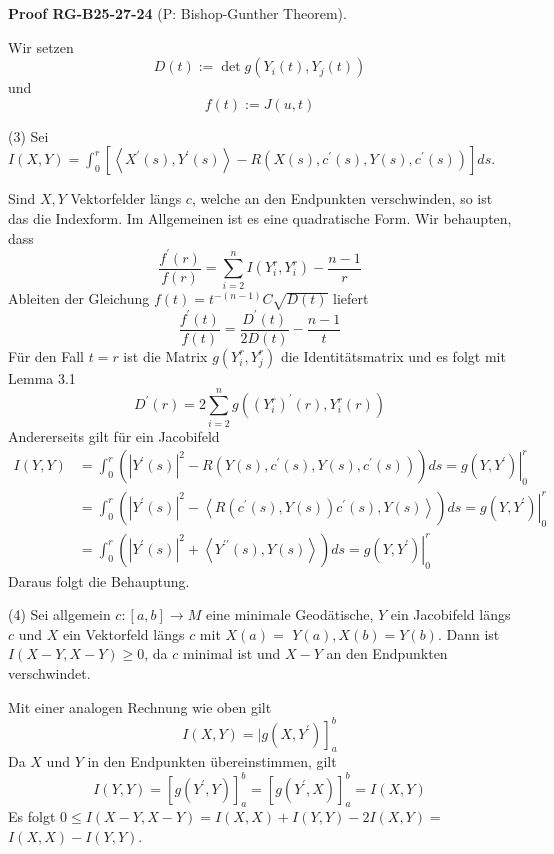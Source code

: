 \documentclass[10pt, letterpaper]{article}
\newcommand{\CustomHeading}[3]{%
  \par\medskip\noindent%
  \textbf{#1 #2} \textnormal{(#3)}.\enskip%
}
\newenvironment{PROOF}[2]{\begin{unitbox}\CustomHeading{Proof}{#1}{#2}}{\end{unitbox}}
\begin{document}
\begin{PROOF}{RG-B25-27-24}{P: Bishop-Gunther Theorem}
Wir setzen
$$
D(t):=\operatorname{det} g\left(Y_{i}(t), Y_{j}(t)\right)
$$
und
$$
f(t):=J(u, t)
$$


(3) Sei
$I(X, Y)=\int_{0}^{r}\left[\left\langle X^{\prime}(s), Y^{\prime}(s)\right\rangle-R\left(X(s), c^{\prime}(s), Y(s), c^{\prime}(s)\right)\right] d s$.


Sind $X, Y$ Vektorfelder längs $c$, welche an den Endpunkten verschwinden, so ist das die Indexform. Im Allgemeinen ist es eine quadratische Form. Wir behaupten, dass
\begin{equation*}
\frac{f^{\prime}(r)}{f(r)}=\sum_{i=2}^{n} I\left(Y_{i}^{r}, Y_{i}^{r}\right)-\frac{n-1}{r} \tag{12}
\end{equation*}
Ableiten der Gleichung $f(t)=t^{-(n-1)} C \sqrt{D(t)}$ liefert
$$
\frac{f^{\prime}(t)}{f(t)}=\frac{D^{\prime}(t)}{2 D(t)}-\frac{n-1}{t}
$$
Für den Fall $t=r$ ist die Matrix $g\left(Y_{i}^{r}, Y_{j}^{r}\right)$ die Identitätsmatrix und es folgt mit Lemma 3.1
$$
D^{\prime}(r)=2 \sum_{i=2}^{n} g\left(\left(Y_{i}^{r}\right)^{\prime}(r), Y_{i}^{r}(r)\right)
$$
Andererseits gilt für ein Jacobifeld
$$
\begin{aligned}
I(Y, Y) & =\int_{0}^{r}\left(\left|Y^{\prime}(s)\right|^{2}-R\left(Y(s), c^{\prime}(s), Y(s), c^{\prime}(s)\right)\right) d s=\left.g\left(Y, Y^{\prime}\right)\right|_{0} ^{r} \\
& =\int_{0}^{r}\left(\left|Y^{\prime}(s)\right|^{2}-\left\langle R\left(c^{\prime}(s), Y(s)\right) c^{\prime}(s), Y(s)\right\rangle\right) d s=\left.g\left(Y, Y^{\prime}\right)\right|_{0} ^{r} \\
& =\int_{0}^{r}\left(\left|Y^{\prime}(s)\right|^{2}+\left\langle Y^{\prime \prime}(s), Y(s)\right\rangle\right) d s=\left.g\left(Y, Y^{\prime}\right)\right|_{0} ^{r}
\end{aligned}
$$
Daraus folgt die Behauptung.


(4) Sei allgemein $c:[a, b] \rightarrow M$ eine minimale Geodätische, $Y$ ein Jacobifeld längs $c$ und $X$ ein Vektorfeld längs $c$ mit $X(a)=$ $Y(a), X(b)=Y(b)$. Dann ist $I(X-Y, X-Y) \geq 0$, da $c$ minimal ist und $X-Y$ an den Endpunkten verschwindet.

Mit einer analogen Rechnung wie oben gilt
$$
\left.I(X, Y)=\mid g\left(X, Y^{\prime}\right)\right]_{a}^{b}
$$
Da $X$ und $Y$ in den Endpunkten übereinstimmen, gilt
$$
I(Y, Y)=\left[g\left(Y^{\prime}, Y\right)\right]_{a}^{b}=\left[g\left(Y^{\prime}, X\right)\right]_{a}^{b}=I(X, Y)
$$
Es folgt $0 \leq I(X-Y, X-Y)=I(X, X)+I(Y, Y)-2 I(X, Y)=$ $I(X, X)-I(Y, Y)$.\\



\end{PROOF}
\end{document}
